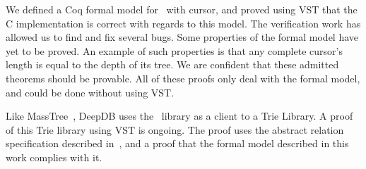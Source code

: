 We defined a Coq formal model for \btrees\ with cursor, and proved using VST that the C implementation is correct with regards to this model.
The verification work has allowed us to find and fix several bugs.
Some properties of the formal model have yet to be proved.
An example of such properties is that any complete cursor's length is equal to the depth of its tree.
We are confident that these admitted theorems should be provable.
All of these proofs only deal with the formal model, and could be done without using VST.

Like MassTree~\cite{masstree}, DeepDB uses the \btrees\ library as a client to a Trie Library. A proof of this Trie library using VST is ongoing.
The proof uses the abstract relation specification described in~\cite{brian}, and a proof that the formal model described in this work complies with it.

